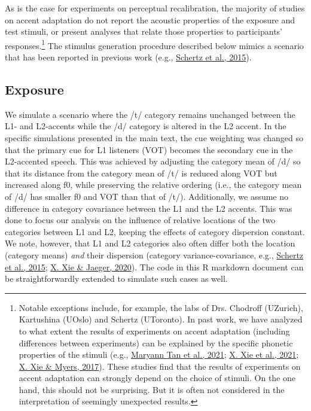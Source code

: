 \documentclass[
  11pt,
  english,
  man,floatsintext]{apa6}
\begin{document}
As is the case for experiments on perceptual recalibration, the majority of studies on accent adaptation do not report the acoustic properties of the exposure and test stimuli, or present analyses that relate those properties to participants' responses.\footnote{Notable exceptions include, for example, the labs of Drs. Chodroff (UZurich), Kartushina (UOslo) and Schertz (UToronto). In past work, we have analyzed to what extent the results of experiments on accent adaptation (including differences between experiments) can be explained by the specific phonetic properties of the stimuli (e.g., \protect\hyperlink{ref-tan2021}{Maryann Tan et al., 2021}; \protect\hyperlink{ref-xie2021jep}{X. Xie et al., 2021}; \protect\hyperlink{ref-xie2017}{X. Xie \& Myers, 2017}). These studies find that the results of experiments on accent adaptation can strongly depend on the choice of stimuli. On the one hand, this should not be surprising. But it is often not considered in the interpretation of seemingly unexpected results.} The stimulus generation procedure described below mimics a scenario that has been reported in previous work (e.g., \protect\hyperlink{ref-schertz2015}{Schertz et al., 2015}).

\hypertarget{exposure-1}{%
\subsection{Exposure}\label{exposure-1}}

We simulate a scenario where the /t/ category remains unchanged between the L1- and L2-accents while the /d/ category is altered in the L2 accent. In the specific simulations presented in the main text, the cue weighting was changed so that the primary cue for L1 listeners (VOT) becomes the secondary cue in the L2-accented speech. This was achieved by adjusting the category mean of /d/ so that its distance from the category mean of /t/ is reduced along VOT but increased along f0, while preserving the relative ordering (i.e., the category mean of /d/ has smaller f0 and VOT than that of /t/). Additionally, we assume no difference in category covariance between the L1 and the L2 accents. This was done to focus our analysis on the influence of relative locations of the two categories between L1 and L2, keeping the effects of category dispersion constant. We note, however, that L1 and L2 categories also often differ both the location (category means) \emph{and} their dispersion (category variance-covariance, e.g., \protect\hyperlink{ref-schertz2015}{Schertz et al., 2015}; \protect\hyperlink{ref-xie-jaeger2020}{X. Xie \& Jaeger, 2020}). The code in this R markdown document can be straightforwardly extended to simulate such cases as well.
\end{document}
